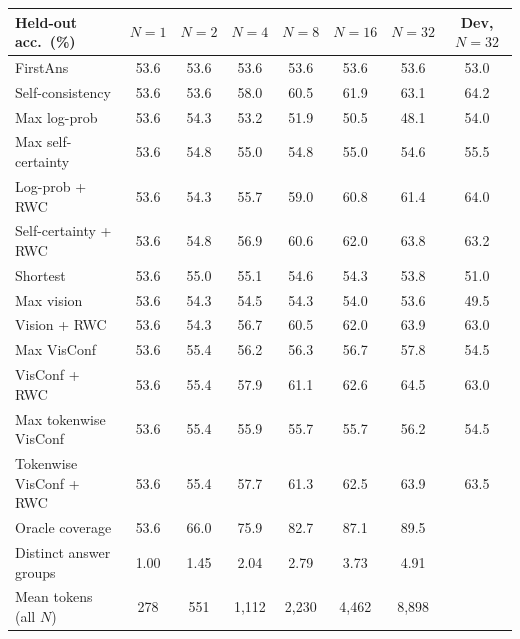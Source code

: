\begin{tabular}{lccccccc}
\toprule
Held-out acc.\ (\%) & $N=1$ & $N=2$ & $N=4$ & $N=8$ & $N=16$ & $N=32$ & Dev, $N=32$ \\
\midrule
FirstAns & 53.6 & 53.6 & 53.6 & 53.6 & 53.6 & 53.6 & 53.0 \\
Self-consistency & 53.6 & 53.6 & 58.0 & 60.5 & 61.9 & 63.1 & 64.2 \\
Max log-prob & 53.6 & 54.3 & 53.2 & 51.9 & 50.5 & 48.1 & 54.0 \\
Max self-certainty & 53.6 & 54.8 & 55.0 & 54.8 & 55.0 & 54.6 & 55.5 \\
Log-prob + RWC & 53.6 & 54.3 & 55.7 & 59.0 & 60.8 & 61.4 & 64.0 \\
Self-certainty + RWC & 53.6 & 54.8 & 56.9 & 60.6 & 62.0 & 63.8 & 63.2 \\
Shortest & 53.6 & 55.0 & 55.1 & 54.6 & 54.3 & 53.8 & 51.0 \\
Max vision & 53.6 & 54.3 & 54.5 & 54.3 & 54.0 & 53.6 & 49.5 \\
Vision + RWC & 53.6 & 54.3 & 56.7 & 60.5 & 62.0 & 63.9 & 63.0 \\
Max VisConf & 53.6 & 55.4 & 56.2 & 56.3 & 56.7 & 57.8 & 54.5 \\
VisConf + RWC & 53.6 & 55.4 & 57.9 & 61.1 & 62.6 & 64.5 & 63.0 \\
Max tokenwise VisConf & 53.6 & 55.4 & 55.9 & 55.7 & 55.7 & 56.2 & 54.5 \\
Tokenwise VisConf + RWC & 53.6 & 55.4 & 57.7 & 61.3 & 62.5 & 63.9 & 63.5 \\ \midrule
Oracle coverage & 53.6 & 66.0 & 75.9 & 82.7 & 87.1 & 89.5 &  \\
Distinct answer groups & 1.00 & 1.45 & 2.04 & 2.79 & 3.73 & 4.91 &  \\
Mean tokens (all $N$) & 278 & 551 & 1,112 & 2,230 & 4,462 & 8,898 &  \\
\bottomrule
\end{tabular}